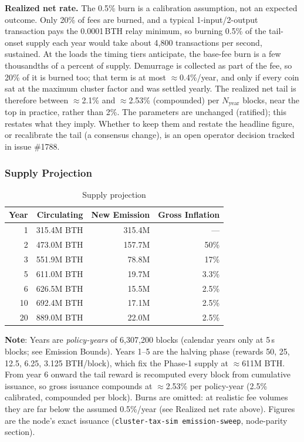 \textbf{Realized net rate.} The 0.5\% burn is a calibration assumption, not
an expected outcome. Only 20\% of fees are burned, and a typical
1-input/2-output transaction pays the 0.0001\,BTH relay minimum, so burning
0.5\% of the tail-onset supply each year would take about 4,800 transactions
per second, sustained. At the loads the timing tiers anticipate, the base-fee
burn is a few thousandths of a percent of supply. Demurrage is collected as
part of the fee, so 20\% of it is burned too; that term is at most
$\approx$0.4\%/year, and only if every coin sat at the maximum cluster factor
and was settled yearly. The realized net tail is therefore between $\approx$2.1\%
and $\approx$2.53\% (compounded) per $N_{\text{year}}$ blocks, near the top in practice, rather than
2\%. The parameters are unchanged (ratified); this restates what they imply.
Whether to keep them and restate the headline figure, or recalibrate the tail
(a consensus change), is an open operator decision tracked in issue \#1788.

\subsubsection{Supply Projection}

\begin{table}[h]
\centering
\caption{Supply projection}
\label{tab:supply}
\begin{tabular}{@{}rrrr@{}}
\toprule
\textbf{Year} & \textbf{Circulating} & \textbf{New Emission} & \textbf{Gross Inflation} \\
\midrule
1 & 315.4M BTH & 315.4M & --- \\
2 & 473.0M BTH & 157.7M & 50\% \\
3 & 551.9M BTH & 78.8M & 17\% \\
5 & 611.0M BTH & 19.7M & 3.3\% \\
6 & 626.5M BTH & 15.5M & 2.5\% \\
10 & 692.4M BTH & 17.1M & 2.5\% \\
20 & 889.0M BTH & 22.0M & 2.5\% \\
\bottomrule
\end{tabular}
\end{table}

\textbf{Note}: Years are \emph{policy-years} of 6,307,200 blocks (calendar
years only at 5\,s blocks; see Emission Bounds). Years 1--5 are the halving
phase (rewards 50, 25, 12.5, 6.25, 3.125 BTH/block), which fix the Phase-1
supply at $\approx$611M BTH. From year 6 onward the tail reward is recomputed
every block from cumulative issuance, so gross issuance compounds at
$\approx$2.53\% per policy-year (2.5\% calibrated, compounded per block).
Burns are omitted: at realistic fee volumes they are far below the assumed
0.5\%/year (see Realized net rate above). Figures are the node's exact
issuance (\texttt{cluster-tax-sim emission-sweep}, node-parity section).

